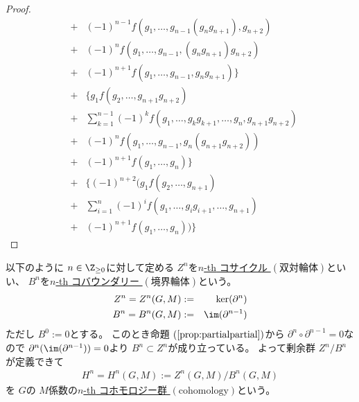 \documentclass[../master_galois_theory]{subfiles}
\begin{document}
\begin{proof}
\begin{eqnarray*}
  & + & (-1)^{n-1} f(g_1 , \dots , g_{n-1} (g_n g_{n+1}) , g_{n+2}) \\
  & + & (-1)^n f(g_1 , \dots , g_{n-1} , (g_n g_{n+1}) g_{n+2}) \\
  & + & (-1)^{n+1} f(g_1 , \dots , g_{n-1} , g_n g_{n+1}) \} \\
  & + & \{ g_1 f(g_2 , \dots , g_{n+1} g_{n+2}) \\
  & + & \sum_{k=1}^{n-1} (-1)^k f(g_1 , \dots , g_k g_{k+1} , \dots , g_n , g_{n+1} g_{n+2}) \\
  & + & (-1)^n f(g_1 , \dots , g_{n-1} , g_n (g_{n+1} g_{n+2})) \\
  & + & (-1)^{n+1} f(g_1 , \dots , g_n) \} \\
  & + & \{ (-1)^{n+2} (g_1 f(g_2 , \dots , g_{n+1}) \\
  & + & \sum_{i=1}^n (-1)^i f(g_1 , \dots , g_i g_{i+1} , \dots , g_{n+1}) \\
  & + & (-1)^{n+1} f(g_1 , \dots , g_n) ) \}
\end{eqnarray*}
\end{proof}

\begin{defi}
  以下のように $ n \in \Z_{\geq 0}$に対して定める $Z^n$を\underline{$n$\rm{-th} コサイクル $(双対輪体)$}といい、
  $B^n$を\underline{$n$\rm{-th} コバウンダリー $(境界輪体)$}という。
  \begin{eqnarray*}
    Z^n = Z^n(G,M) & := & \ker(\partial^n) \\
    B^n = B^n(G,M) & := & \im(\partial^{n-1}) \\
  \end{eqnarray*}
  ただし $B^0 := 0$とする。
  このとき命題 $(\mathrm{\ref{prop:partialpartial}})$から
  $\partial^n \circ \partial^{n-1} = 0$なので $\partial^n(\im(\partial^{n-1})) = 0$より $B^n \subset Z^n$が成り立っている。
  よって剰余群 $Z^n/B^n$が定義できて
  \begin{eqnarray*}
    H^n = H^n(G,M) := Z^n(G,M)/B^n(G,M)
  \end{eqnarray*}
  を $G$の $M$係数の\underline{$n$\rm{-th} コホモロジー群 $(\mathrm{cohomology})$}という。
\end{defi}
\end{document}
